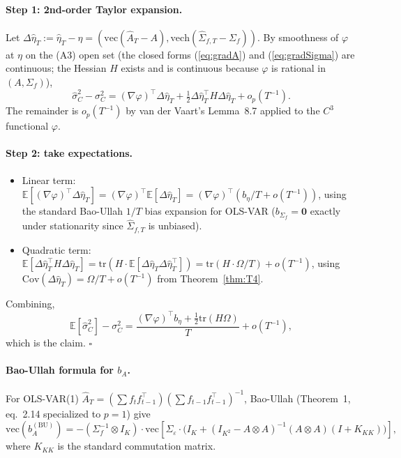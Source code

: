 \documentclass[11pt,letterpaper]{article}
\theoremstyle{remark}
\newcommand{\Sigmaf}{\Sigma_f}
\newcommand{\Sigmae}{\Sigma_\varepsilon}
\newcommand{\sigC}{\sigma^2_C}
\newcommand{\hatsigC}{\widehat{\sigma}^2_C}
\newcommand{\Ehat}{\widehat{A}}
\newcommand{\trace}{\mathrm{tr}}
\newcommand{\vech}{\mathrm{vech}}
\newcommand{\Cov}{\mathrm{Cov}}
\newcommand{\E}{\mathbb{E}}
\begin{document}
\paragraph{Step 1: 2nd-order Taylor expansion.} Let $\Delta \widehat\eta_T := \widehat\eta_T - \eta = (\mathrm{vec}(\Ehat_T - A), \vech(\widehat{\Sigma}_{f, T} - \Sigmaf))$. By smoothness of $\varphi$ at $\eta$ on the (A3) open set (the closed forms (\ref{eq:gradA}) and (\ref{eq:gradSigma}) are continuous; the Hessian $H$ exists and is continuous because $\varphi$ is rational in $(A, \Sigmaf)$),
\begin{equation*}
\hatsigC - \sigC = (\nabla \varphi)^\top \Delta \widehat\eta_T + \tfrac{1}{2} \Delta \widehat\eta_T^\top H \Delta \widehat\eta_T + o_p(T^{-1}).
\end{equation*}
The remainder is $o_p(T^{-1})$ by van der Vaart's Lemma~8.7 applied to the $C^3$ functional $\varphi$.

\paragraph{Step 2: take expectations.}
\begin{itemize}[leftmargin=1.5em,itemsep=0.1em]
\item Linear term: $\E[(\nabla \varphi)^\top \Delta \widehat\eta_T] = (\nabla \varphi)^\top \E[\Delta \widehat\eta_T] = (\nabla \varphi)^\top (b_\eta / T + o(T^{-1}))$, using the standard Bao-Ullah \cite{BaoUllah2002} $1/T$ bias expansion for OLS-VAR ($b_{\Sigmaf} = \mathbf{0}$ exactly under stationarity since $\widehat{\Sigma}_{f, T}$ is unbiased).
\item Quadratic term: $\E[\Delta \widehat\eta_T^\top H \Delta \widehat\eta_T] = \trace(H \cdot \E[\Delta \widehat\eta_T \Delta \widehat\eta_T^\top]) = \trace(H \cdot \Omega/T) + o(T^{-1})$, using $\Cov(\Delta \widehat\eta_T) = \Omega/T + o(T^{-1})$ from Theorem~\ref{thm:T4}.
\end{itemize}
Combining,
\begin{equation*}
\E[\hatsigC] - \sigC = \frac{(\nabla \varphi)^\top b_\eta + \tfrac{1}{2} \trace(H \Omega)}{T} + o(T^{-1}),
\end{equation*}
which is the claim. $\square$

\paragraph{Bao-Ullah formula for $b_A$.} For OLS-VAR(1) $\Ehat_T = (\sum f_t f_{t-1}^\top)(\sum f_{t-1} f_{t-1}^\top)^{-1}$, Bao-Ullah \cite{BaoUllah2002} (Theorem~1, eq.~2.14 specialized to $p = 1$) give
\begin{equation*}
\mathrm{vec}(b_A^{(\mathrm{BU})}) = -(\Sigmaf^{-1} \otimes I_K) \cdot \mathrm{vec}\!\left[\Sigmae \cdot \big(I_K + (I_{K^2} - A \otimes A)^{-1} (A \otimes A)(I + K_{KK})\big)\right],
\end{equation*}
where $K_{KK}$ is the standard commutation matrix.
\end{document}
